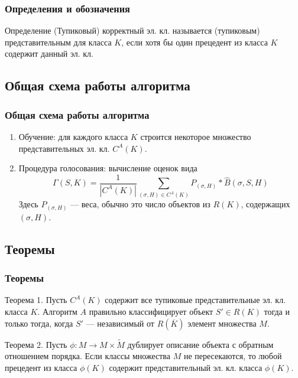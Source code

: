 \documentclass[
	11pt,
]{beamer}
\begin{document}
\begin{frame}
	\frametitle{Определения и обозначения}

	\begin{block}{Определение}
		(Тупиковый) корректный эл. кл. называется (тупиковым) представительным для класса $K$, если хотя бы один прецедент из класса $K$ содержит данный эл. кл.
	\end{block}
\end{frame}

\subsection{Общая схема работы алгоритма}

\begin{frame}
	\frametitle{Общая схема работы алгоритма}

	\begin{enumerate}
		\item Обучение: для каждого класса $K$ строится некоторое множество представительных эл. кл. $C^A(K)$.
		\item Процедура голосования: вычисление оценок вида
			  $$\Gamma(S, K) = \frac{1}{|C^A(K)|} \sum_{(\sigma, H) \in C^A(K)} P_{(\sigma, H)} * \hat{B}(\sigma, S, H)$$
			  Здесь $P_{(\sigma, H)}$ — веса, обычно это число объектов из $R(K)$, содержащих $(\sigma, H)$.
	\end{enumerate}
\end{frame}

\subsection{Теоремы}

\begin{frame}
	\frametitle{Теоремы}
	
	\begin{block}{Теорема 1.}
		Пусть $C^A(K)$ содержит все тупиковые представительные эл. кл. класса $K$.
		Алгоритм $A$ правильно классифицирует объект $S' \in R(K)$ тогда и только тогда, когда $S'$ — независимый от $R(\overline{K})$ элемент множества $M$.
	\end{block}

	\begin{block}{Теорема 2.}
		Пусть $\phi: M \rightarrow M \times \tilde{M}$ дублирует описание объекта с обратным отношением порядка.
		Если классы множества $M$ не пересекаются, то любой прецедент из класса $\phi(K)$ содержит представительный эл. кл. класса $\phi(K)$.
	\end{block}

\end{frame}
\end{document}
